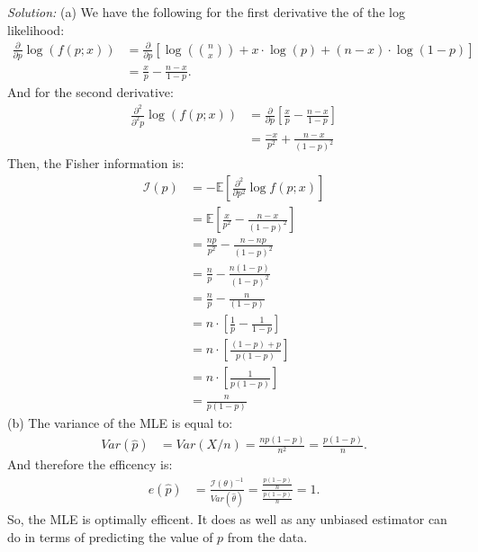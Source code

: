 \documentclass{tufte-handout}
\begin{document}
\textit{Solution:} (a) We have the following for the first derivative the of the log likelihood:
\begin{align*}
\frac{\partial}{\partial p} \log(f(p; x))
&= \frac{\partial}{\partial p} \left[ \log(\binom{n}{x}) +  x \cdot \log(p) + (n-x) \cdot \log(1-p) \right] \\
&= \frac{x}{p} - \frac{n-x}{1-p}.
\end{align*}
And for the second derivative:
\begin{align*}
\frac{\partial^2}{\partial^2 p} \log(f(p; x))
&= \frac{\partial}{\partial p} \left[ \frac{x}{p} - \frac{n-x}{1-p} \right] \\
&= \frac{-x}{p^2} + \frac{n-x}{(1-p)^2}
\end{align*}
Then, the Fisher information is:
\begin{align*}
\mathcal{I}(p) &= - \mathbb{E} \left[ \frac{\partial^2}{\partial p^2} \log f(p; x) \right] \\
&= \mathbb{E} \left[ \frac{x}{p^2} - \frac{n-x}{(1-p)^2} \right] \\
&= \frac{np}{p^2} - \frac{n-np}{(1-p)^2} \\
&= \frac{n}{p} - \frac{n(1-p)}{(1-p)^2} \\
&= \frac{n}{p} - \frac{n}{(1-p)} \\
&= n \cdot \left[ \frac{1}{p} - \frac{1}{1-p} \right] \\
&= n \cdot \left[ \frac{(1 - p) + p}{p (1 - p)} \right] \\
&= n \cdot \left[ \frac{1}{p (1 - p)} \right] \\
&= \frac{n}{p (1 - p)}
\end{align*}
(b) The variance of the MLE is equal to:
\begin{align*}
Var(\hat{p}) &= Var(X/n) = \frac{np(1-p)}{n^2} = \frac{p(1-p)}{n}.
\end{align*}
And therefore the efficency is:
\begin{align*}
e(\hat{p}) &= \frac{\mathcal{I}(\theta)^{-1}}{Var(\widehat{\theta})} = \frac{\frac{p (1 - p)}{n}}{\frac{p(1-p)}{n}} = 1.
\end{align*}
So, the MLE is optimally efficent. It does as well as any unbiased estimator can do in
terms of predicting the value of $p$ from the data.
\end{document}
